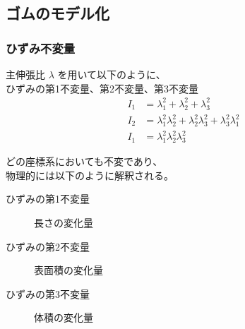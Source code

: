 \documentclass[12pt, dvipdfmx]{beamer}
\begin{document}


\subsection{ゴムのモデル化}

\begin{frame}
	\frametitle{ひずみ不変量}

	主伸張比 $\lambda$ を用いて以下のように、\\ひずみの第1不変量、第2不変量、第3不変量
		\begin{align*}
			I_1 &= \lambda_1^2 + \lambda_2^2 + \lambda_3^2 \\
			I_2 &= \lambda_1^2\lambda_2^2 + \lambda_2^2\lambda_3^2 + \lambda_3^2\lambda_1^2 \\
			I_1 &= \lambda_1^2\lambda_2^2\lambda_3^2
		\end{align*}

	どの座標系においても不変であり、\\物理的には以下のように解釈される。
	\begin{description}
		\item [ひずみの第1不変量]
		長さの変化量
		\item [ひずみの第2不変量]
		表面積の変化量
		\item [ひずみの第3不変量]
		体積の変化量
	\end{description}
\end{frame}
\end{document}
